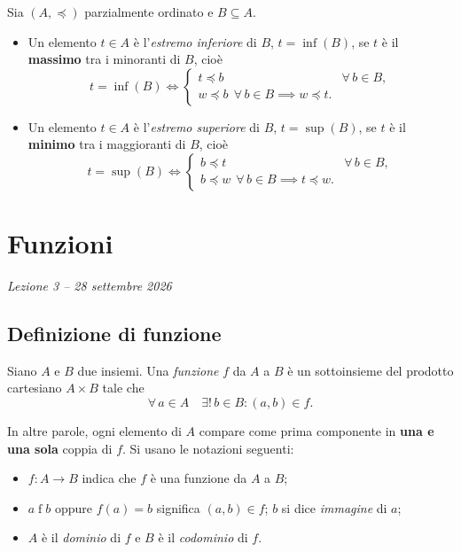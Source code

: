 \documentclass[11pt,a4paper]{article}
\begin{document}
\begin{definizione}
Sia $(A, \preceq)$ parzialmente ordinato e $B \subseteq A$.
\begin{itemize}
    \item Un elemento $t \in A$ è l'\emph{estremo inferiore} di $B$,
          $t = \inf(B)$, se $t$ è il \textbf{massimo} tra i minoranti di
          $B$, cioè
          \[
          t = \inf(B) \iff
          \begin{cases}
            t \preceq b & \forall\, b \in B, \\
            w \preceq b \ \ \forall\, b \in B \implies w \preceq t.
          \end{cases}
          \]
    \item Un elemento $t \in A$ è l'\emph{estremo superiore} di $B$,
          $t = \sup(B)$, se $t$ è il \textbf{minimo} tra i maggioranti di
          $B$, cioè
          \[
          t = \sup(B) \iff
          \begin{cases}
            b \preceq t & \forall\, b \in B, \\
            b \preceq w \ \ \forall\, b \in B \implies t \preceq w.
          \end{cases}
          \]
\end{itemize}
\end{definizione}

\section[Funzioni (Lezione 3 -- 28 settembre 2026)]{Funzioni}
\noindent\emph{Lezione 3 -- 28 settembre 2026}
\subsection{Definizione di funzione}

\begin{definizione}
Siano $A$ e $B$ due insiemi. Una \emph{funzione} $f$ da $A$ a $B$ è un
sottoinsieme del prodotto cartesiano $A \times B$ tale che
\[
\forall\, a \in A \quad \exists!\, b \in B : (a, b) \in f.
\]
\end{definizione}

In altre parole, ogni elemento di $A$ compare come prima componente in
\textbf{una e una sola} coppia di $f$. Si usano le notazioni seguenti:
\begin{itemize}
    \item $f : A \to B$ indica che $f$ è una funzione da $A$ a $B$;
    \item $a \mathrel{f} b$ oppure $f(a) = b$ significa $(a, b) \in f$;
          $b$ si dice \emph{immagine} di $a$;
    \item $A$ è il \emph{dominio} di $f$ e $B$ è il \emph{codominio} di $f$.
\end{itemize}
\end{document}
